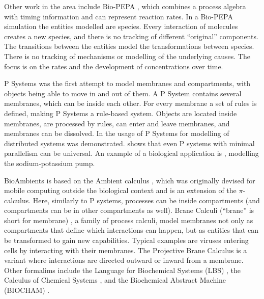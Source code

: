 Other work in the area include Bio-PEPA \cite{CiocchettaBiopepa}, which combines a process algebra with timing information and can represent reaction rates. In a Bio-PEPA simulation the entities modelled are species. Every interaction of molecules creates a new species, and there is no tracking of different “original” components. The transitions between the entities model the transformations between species. There is no tracking of mechanisms or modelling of the underlying causes. The focus is on the rates and the development of concentrations over time. 

P Systems \cite{psystems} was the first attempt to model membranes and compartments, with objects being able to move in and out of them. A P System contains several membranes, which can be inside each other. For every membrane a set of rules is defined, making P Systems a rule-based system. Objects are located inside membranes, are processed by rules, can enter and leave membranes, and membranes can be dissolved. In \cite{CIOBANU2003123} the usage of P Systems for modelling of distributed systems was demonstrated. \cite{CIOBANU2007117} shows that even P systems with minimal parallelism can be universal. An example of a biological application is \cite{10.1007/978-3-540-31837-8_12}, modelling the sodium-potassium pump.

BioAmbients \cite{RegevBioambients} is based on the Ambient calculus \cite{CARDELLI2000177}, which was originally devised for mobile computing outside the biological context and is an extension of the $\pi$-calculus. Here, similarly to P systems, processes can be inside compartments (and compartments can be in other compartments as well). Brane Calculi (“brane” is short for membrane) \cite{CardelliMobileAmbients}, a family of process calculi, model membranes not only as compartments that define which interactions can happen, but as entities that can be transformed to gain new capabilities. Typical examples are viruses entering cells by interacting with their membranes. The Projective Brane Calculus \cite{ProjectiveBrane} is a variant where interactions are directed outward or inward from a membrane. Other formalims include the Language for Biochemical Systems (LBS) \cite{PlotkinLBS}, the Calculus of Chemical Systems \cite{PlotkinCCS}, and the Biochemical Abstract Machine (BIOCHAM) \cite{biocham}.

